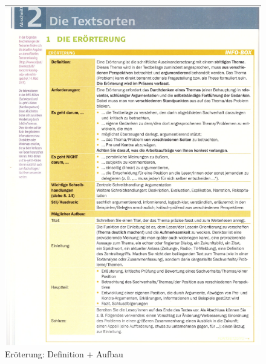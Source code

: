 \begin{figure}[h][p]
    \centering
    \includegraphics[scale=0.8]{pics/Screenshot from 2023-02-06 12-26-42.png}
    \caption{Eröterung: Definition + Aufbau}
    \label{fig:impl:eröterung1}
\end{figure}

